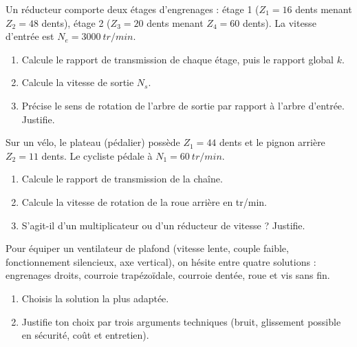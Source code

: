 \documentclass[11pt]{article}
\newcounter{popsec}
\newcounter{popsub}
\newcommand{\courssub}[1]{%
  \stepcounter{popsub}%
  \par\vspace{9pt}\noindent{\popxbold\fontsize{11.5}{13}\selectfont\color{popink}{\color{poporange}\thepopsec.\thepopsub}\hspace{6pt}#1}\par\nopagebreak\vspace{4pt}
}
\begin{document}
\begin{exercice}
Un réducteur comporte deux étages d'engrenages : étage 1 ($Z_1 = 16$ dents menant $Z_2 = 48$ dents), étage 2 ($Z_3 = 20$ dents menant $Z_4 = 60$ dents). La vitesse d'entrée est $N_e = \SI{3000}{tr/min}$.
\begin{enumerate}
\item Calcule le rapport de transmission de chaque étage, puis le rapport global $k$.
\item Calcule la vitesse de sortie $N_s$.
\item Précise le sens de rotation de l'arbre de sortie par rapport à l'arbre d'entrée. Justifie.
\end{enumerate}
\end{exercice}

\begin{exercice}
Sur un vélo, le plateau (pédalier) possède $Z_1 = 44$ dents et le pignon arrière $Z_2 = 11$ dents. Le cycliste pédale à $N_1 = \SI{60}{tr/min}$.
\begin{enumerate}
\item Calcule le rapport de transmission de la chaîne.
\item Calcule la vitesse de rotation de la roue arrière en tr/min.
\item S'agit-il d'un multiplicateur ou d'un réducteur de vitesse ? Justifie.
\end{enumerate}
\end{exercice}

\begin{exercice}
Pour équiper un ventilateur de plafond (vitesse lente, couple faible, fonctionnement silencieux, axe vertical), on hésite entre quatre solutions : engrenages droits, courroie trapézoïdale, courroie dentée, roue et vis sans fin.
\begin{enumerate}
\item Choisis la solution la plus adaptée.
\item Justifie ton choix par trois arguments techniques (bruit, glissement possible en sécurité, coût et entretien).
\end{enumerate}
\end{exercice}

\courssub{Je me prépare au Bac}
\end{document}
